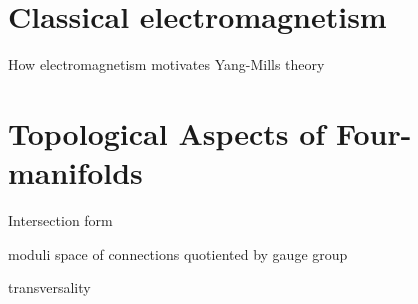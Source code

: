 \section{Classical electromagnetism}
How electromagnetism motivates Yang-Mills theory

\section{Topological Aspects of Four-manifolds}
Intersection form

moduli space of connections quotiented by gauge group

transversality



